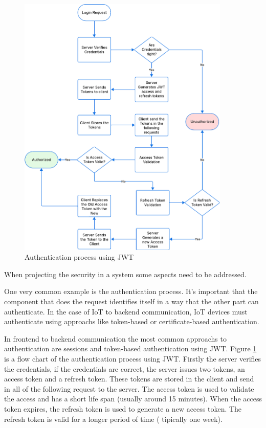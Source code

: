 \begin{figure}[htbp]
	\centering
	\includegraphics[width=0.9\textwidth, height=0.6\textheight, keepaspectratio]{Chapters/Figures/Security/JWT.pdf}
	\caption{Authentication process using \gls{JWT}}
	\label{fig:security:JWT}
\end{figure}

When projecting the security in a system some
aspects need to be addressed.

One very common example is the
authentication process.
It's important that the component that does the request identifies itself
in a way that the other part can authenticate.
In the case of \gls{IoT} to backend communication, \gls{IoT} devices must authenticate
using approachs like token-based or certificate-based authentication.

In frontend to backend communication the most common approachs to
authentication are sessions and token-based authentication using \gls{JWT}.
Figure \ref{fig:security:JWT}
is a flow chart of the authentication process using \gls{JWT}.
Firstly the server verifies the credentials, if the credentials are
correct, the server issues two tokens, an access token and a refresh
token. These tokens are stored in the client and send in all of the
following request to the server. The access token is used to validate
the access and has a short life span (usually around 15 minutes). When
the access token expires, the refresh token is used to generate a new
access token. The refresh token is valid for a longer period of time (
tipically one week).

